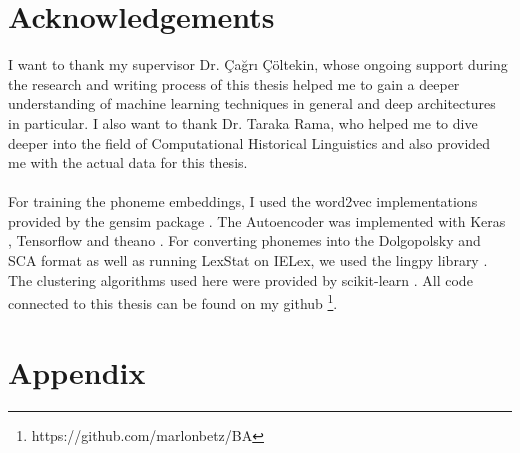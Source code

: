 \documentclass[6pt]{article}
\begin{document}
\section{Acknowledgements}
I want to thank my supervisor Dr. Çağrı Çöltekin, whose ongoing support during the research and writing process of this thesis helped me to gain a deeper understanding of machine learning techniques in general and deep architectures in particular.
I also want to thank Dr. Taraka Rama, who helped me to dive deeper into the field of Computational Historical Linguistics and also provided me with the actual data for this thesis. \\\\
For training the phoneme embeddings, I used the word2vec implementations provided by the gensim package \citep{rehurek_lrec}. The Autoencoder was implemented with Keras \citep{chollet2015keras}, Tensorflow \citep{tensorflow2015-whitepaper} and theano \citep{2016arXiv160502688short}. For converting phonemes into the Dolgopolsky and SCA format as well as running LexStat on IELex, we used the lingpy library \citep{List2016e}. The clustering algorithms used here were provided by scikit-learn \citep{scikit-learn}. All code connected to this thesis can be found on my github \footnote{https://github.com/marlonbetz/BA}.


\appendix
\section{Appendix} \label{App:Appendix}
\end{document}
